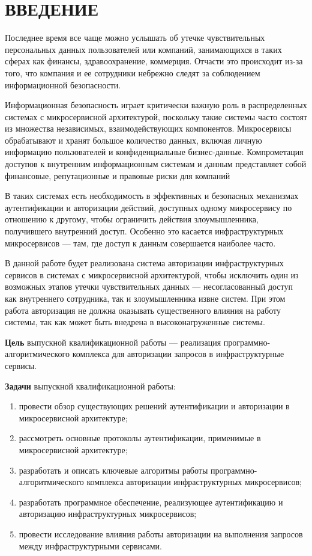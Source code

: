 {\centering \chapter*{ВВЕДЕНИЕ}}

Последнее время все чаще можно услышать об утечке чувствительных персональных данных пользователей или компаний, занимающихся в таких сферах как финансы, здравоохранение, коммерция. Отчасти это происходит из-за того, что компания и ее сотрудники небрежно следят за соблюдением информационной безопасности.

Информационная безопасность играет критически важную роль в распределенных системах с микросервисной архитектурой, поскольку такие системы часто состоят из множества независимых, взаимодействующих компонентов. Микросервисы обрабатывают и хранят большое количество данных, включая личную информацию пользователей и конфиденциальные бизнес-данные. Компрометация доступов к внутренним информационным системам и данным представляет собой финансовые, репутационные и правовые риски для компаний

В таких системах есть необходимость в эффективных и безопасных механизмах аутентификации и авторизации действий, доступных одному микросервису по отношению к другому, чтобы ограничить действия злоумышленника, получившего внутренний доступ. Особенно это касается инфраструктурных микросервисов --- там, где доступ к данным совершается наиболее часто.

В данной работе будет реализована система авторизации инфраструктурных сервисов в системах с микросервисной архитектурой, чтобы исключить один из возможных этапов утечки чувствительных данных --- несогласованный доступ как внутреннего сотрудника, так и злоумышленника извне систем. При этом работа авторизация не должна оказывать существенного влияния на работу системы, так как может быть внедрена в высоконагруженные системы.

\textbf{Цель} выпускной квалификационной работы --- реализация программно-алгоритмического комплекса для авторизации запросов в инфраструктурные сервисы.

\textbf{Задачи} выпускной квалификационной работы:
\begin{enumerate}
\item провести обзор существующих решений аутентификации и авторизации в микросервисной архитектуре;
\item рассмотреть основные протоколы аутентификации, применимые в микросервисной архитектуре;
\item разработать и описать ключевые алгоритмы работы программно-алгоритмического комплекса авторизации инфраструктурных микросервисов;
\item разработать программное обеспечение, реализующее аутентификацию и авторизацию инфраструктурных микросервисов;
\item провести исследование влияния работы авторизации на выполнения запросов между инфраструктурными сервисами.
\end{enumerate}



